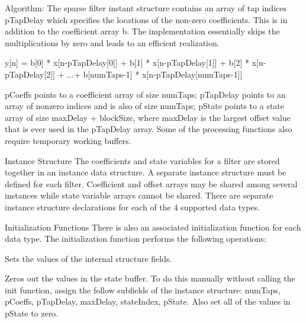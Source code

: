 \begin{DoxyParagraph}{Algorithm\+:}
The sparse filter instant structure contains an array of tap indices {\ttfamily p\+Tap\+Delay} which specifies the locations of the non-\/zero coefficients. This is in addition to the coefficient array {\ttfamily b}. The implementation essentially skips the multiplications by zero and leads to an efficient realization. 
\begin{DoxyPre}
      y[n] = b[0] * x[n-pTapDelay[0]] + b[1] * x[n-pTapDelay[1]] + b[2] * x[n-pTapDelay[2]] + ...+ b[numTaps-1] * x[n-pTapDelay[numTaps-1]]
  \end{DoxyPre}
 
\end{DoxyParagraph}
\begin{DoxyParagraph}{}
 
\end{DoxyParagraph}
\begin{DoxyParagraph}{}
{\ttfamily p\+Coeffs} points to a coefficient array of size {\ttfamily num\+Taps}; {\ttfamily p\+Tap\+Delay} points to an array of nonzero indices and is also of size {\ttfamily num\+Taps}; {\ttfamily p\+State} points to a state array of size {\ttfamily max\+Delay + block\+Size}, where {\ttfamily max\+Delay} is the largest offset value that is ever used in the {\ttfamily p\+Tap\+Delay} array. Some of the processing functions also require temporary working buffers.
\end{DoxyParagraph}
\begin{DoxyParagraph}{Instance Structure}
The coefficients and state variables for a filter are stored together in an instance data structure. A separate instance structure must be defined for each filter. Coefficient and offset arrays may be shared among several instances while state variable arrays cannot be shared. There are separate instance structure declarations for each of the 4 supported data types.
\end{DoxyParagraph}
\begin{DoxyParagraph}{Initialization Functions}
There is also an associated initialization function for each data type. The initialization function performs the following operations\+:
\begin{DoxyItemize}
\item Sets the values of the internal structure fields.
\item Zeros out the values in the state buffer. To do this manually without calling the init function, assign the follow subfields of the instance structure\+: num\+Taps, p\+Coeffs, p\+Tap\+Delay, max\+Delay, state\+Index, p\+State. Also set all of the values in p\+State to zero.
\end{DoxyItemize}
\end{DoxyParagraph}
